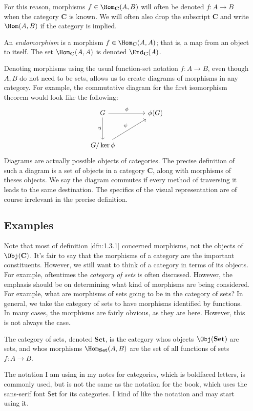 For this reason, morphisms $f\in \Hom_{\mathbf{C}}(A , B) $ will often be denoted $f : A \to B$ when the category $\mathbf{C}$ is known. We will often also drop the subscript $\mathbf{C}$ and write $\Hom(A , B) $ if the category is implied.
\begin{definition}[Endomorphism]\label{dfn:1.3.2}
	An \emph{endomorphism} is a morphism $f\in \Hom_{\mathbf{C}}(A , A) $; that is, a map from an object to itself. The set $\Hom_{\mathbf{C}}(A , A) $ is denoted $\End_{\mathbf{C}}(A)$.
\end{definition}
Denoting morphisms using the usual function-set notation $f : A \to B$, even though $A,B$ do not need to be sets, allows us to create diagrams of morphisms in any category. For example, the commutative diagram for the first isomorphism theorem would look like the following:
\[
	\begin{tikzcd}[row sep=3em, column sep=4em]
		G \arrow[d, "\eta"'] \arrow[r, "\phi "] & \phi (G)\\
		G / \ker \phi \arrow[ur, "\psi"]
	\end{tikzcd}
\]
Diagrams are actually possible objects of categories. The precise definition of such a diagram is a set of objects in a category $\mathbf{C}$, along with morphisms of theses objects. We say the diagram commutes if every method of traversing it leads to the same destination. The specifics of the visual representation are of course irrelevant in the precise definition.
\subsection{Examples}
Note that most of definition \ref{dfn:1.3.1} concerned morphisms, not the objects of $\Obj( \mathbf{C} ) $. It's fair to say that the morphisms of a category are the important constituents. However, we still want to think of a category in terms of its objects. For example, oftentimes the \emph{category of sets} is often discussed. However, the emphasis should be on determining what kind of morphisms are being considered. For example, what are morphisms of sets going to be in the category of sets? In general, we take the category of sets to have morphisms identified by functions. In many cases, the morphisms are fairly obvious, as they are here. However, this is not always the case.
\begin{definition}\label{dfn:1.3.3}
	The category of sets, denoted $\mathbf{Set}$, is the category whos objects $\Obj( \mathbf{Set} ) $ are sets, and whos morphisms $\Hom_{\mathbf{Set}}(A , B) $ are the set of all functions of sets $f : A \to B$.
\end{definition}
The notation I am using in my notes for categories, which is boldfaced letters, is commonly used, but is not the same as the notation for the book, which uses the sans-serif font $\mathsf{Set}$ for its categories. I kind of like the notation and may start using it.

